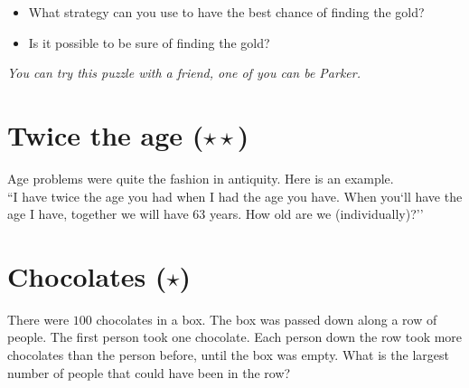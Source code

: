 \documentclass[11pt]{article}
\begin{document}
\begin{itemize}
  \item What strategy can you use to have the best chance of finding the gold?
  \item Is it possible to be sure of finding the gold?
\end{itemize}
\emph{You can try this puzzle with a friend, one of you can be Parker.}

\section{Twice the age ($\star\star$)}
\noindent Age problems were quite the fashion in antiquity. Here is an
example.\\[5mm]
``I have twice the age you had when I had the age you have.
When you`ll have the age I have, together we will have 63 years.
How old are we (individually)?''

\section{Chocolates ($\star$)}
\noindent There were $100$ chocolates in a box. The box was passed down along a row of
people. The first person took one chocolate. Each person down the row took more
chocolates than the person before, until the box was empty.
What is the largest number of people that could have been in the row?
\end{document}
